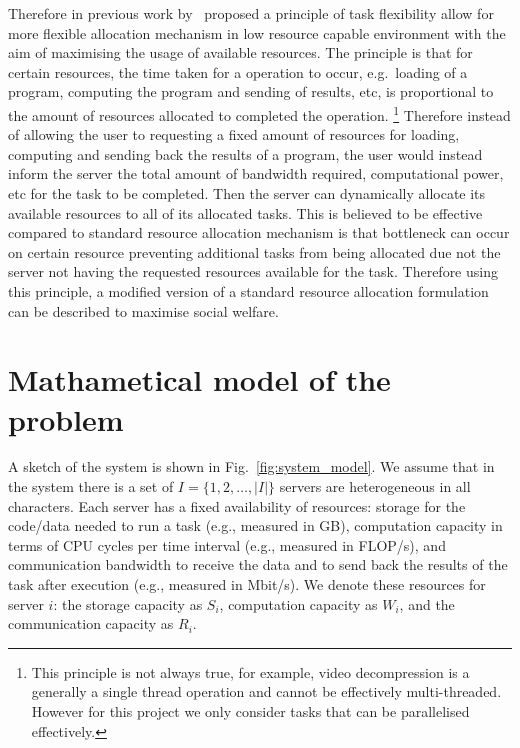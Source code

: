 Therefore in previous work by~\cite{FlexibleResourceAllocation} proposed a principle of task flexibility allow for
more flexible allocation mechanism in low resource capable environment with the aim of maximising the usage of
available resources. The principle is that for certain resources, the time taken for a operation to occur,
e.g.\ loading of a program, computing the program and sending of results, etc, is proportional to the amount of
resources allocated to completed the operation.
\footnote{This principle is not always true, for example, video decompression is a generally a single
thread operation and cannot be effectively multi-threaded. However for this project we only consider tasks
that can be parallelised effectively.}
Therefore instead of allowing the user to requesting a fixed amount of resources for loading, computing and sending back
the results of a program, the user would instead inform the server the total amount of bandwidth required,
computational power, etc for the task to be completed. Then the server can dynamically allocate its available resources
to all of its allocated tasks.
This is believed to be effective compared to standard resource allocation mechanism is that bottleneck can occur on
certain resource preventing additional tasks from being allocated due not the server not having the requested resources
available for the task.
Therefore using this principle, a modified version of a standard resource allocation formulation can be described
to maximise social welfare.

\section{Mathametical model of the problem}
A sketch of the system is shown in Fig.~\ref{fig:system_model}.
We assume that in the system there is a set of $I = \{1,2,\ldots,\left|I\right|\}$ servers are heterogeneous in all
characters. Each server has a fixed availability of resources: storage for the code/data needed to run a task
(e.g., measured in GB), computation capacity in terms of CPU cycles per time interval (e.g., measured in FLOP/s),
and communication bandwidth to receive the data and to send back the results of the task after execution (e.g., measured in Mbit/s).
We denote these resources for server $i$: the storage capacity as $S_i$, computation capacity as $W_i$,
and the communication capacity as $R_i$.

